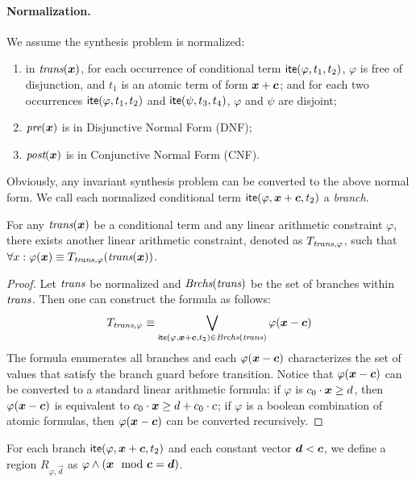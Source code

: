 \documentclass[runningheads]{llncs}
\begin{document}
\paragraph{Normalization.} 
We assume the synthesis problem is normalized:
\begin{enumerate}
\item in $\trans(\vecx)$, for each occurrence of conditional term $\textsf{ite}(\varphi, t_1, t_2)$, $\varphi$ is free of disjunction, and $t_1$ is an atomic term of form $\vecx + \vecc$; and for each two occurrences $\textsf{ite}(\varphi, t_1, t_2)$ and $\textsf{ite}(\psi, t_3, t_4)$, $\varphi$ and $\psi$ are disjoint;
\item $\pre(\vecx)$ is in Disjunctive Normal Form (DNF);
\item $\post(\vecx)$ is in Conjunctive Normal Form (CNF).
\end{enumerate}
Obviously, any invariant synthesis problem can be converted to the above normal form. 
We call each normalized conditional term $\ite(\varphi, \vecx + \vecc, t_2)$ a \emph{branch}.

\begin{theorem}
For any $\trans(\vecx)$ be a conditional term and any linear arithmetic constraint $\varphi$, there exists another linear arithmetic constraint, denoted as $T_{\textit{trans},\varphi}$, such that $\forall x: \varphi(\vecx) \equiv T_{\trans,\varphi}(\trans(\vecx))$.
\end{theorem}
\begin{proof}
Let $\textit{trans}$ be normalized and $\textit{Brchs}(\textit{trans})$ be the set of branches within $\textit{trans}$. Then one can construct the formula as follows: $$T_{\trans,\varphi} \equiv \displaystyle \bigvee_{\ite(\varphi, \vecx + \vecc, t_2) \in \branches(\trans)} \varphi(\vecx - \vecc)$$
The formula enumerates all branches and each $\varphi(\vecx - \vecc)$ characterizes the set of values that satisfy the branch guard before transition. Notice that $\varphi(\vecx - \vecc)$ can be converted to a standard linear arithmetic formula: if $\varphi$ is $c_0 \cdot \vecx \geq d$, then $\varphi(\vecx - \vecc)$ is equivalent to $c_0 \cdot \vecx \geq d + c_0 \cdot c$; if $\varphi$ is a boolean combination of atomic formulas, then $\varphi(\vecx - \vecc)$ can be converted recursively.
\end{proof}

\begin{definition}[Region]
For each branch $\ite(\varphi, \vecx + \vecc, t_2)$ and each constant vector $\vec{d} < \vecc$, we define a region $R_{\varphi, \vec{d}}$ as $\varphi \wedge (\vecx \mod \vecc = \vec{d})$.
\end{definition}





\appendix
%
\end{document}
